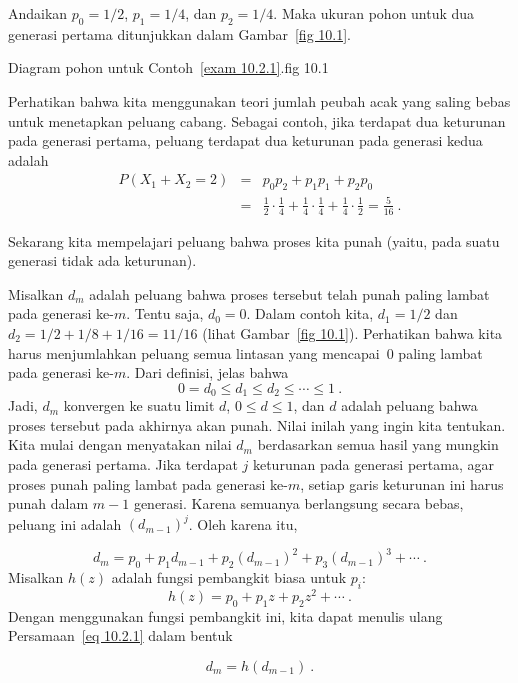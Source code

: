 \begin{example}\label{exam 10.2.1}
Andaikan $p_0 = 1/2$, $p_1 = 1/4$, dan $p_2 = 1/4$.  Maka ukuran pohon
untuk dua generasi pertama ditunjukkan dalam Gambar~\ref{fig 10.1}.

{Diagram pohon untuk Contoh~\protect\ref{exam 10.2.1}\protect.}{fig 10.1}

Perhatikan bahwa kita menggunakan teori jumlah peubah acak yang saling bebas untuk menetapkan
peluang cabang.  Sebagai contoh, jika terdapat dua keturunan pada generasi pertama,
peluang terdapat dua keturunan pada generasi kedua adalah
\begin{eqnarray*}
P(X_1 + X_2 = 2) &=& p_0p_2 + p_1p_1 + p_2p_0 \\
                 &=& \frac12\cdot\frac14 + \frac14\cdot\frac14 +
\frac14\cdot\frac12 = \frac 5{16}\ .
\end{eqnarray*}
\par
Sekarang kita mempelajari peluang bahwa proses kita punah (yaitu, pada suatu
generasi tidak ada keturunan).
\par
Misalkan $d_m$ adalah peluang bahwa proses tersebut telah punah paling lambat pada generasi
ke-$m$.  Tentu saja, $d_0 = 0$.  Dalam contoh kita, $d_1 = 1/2$ dan $d_2 = 1/2
+ 1/8 + 1/16 = 11/16$ (lihat Gambar~\ref{fig 10.1}).  Perhatikan bahwa kita harus menjumlahkan 
peluang semua lintasan yang mencapai~0 paling lambat pada generasi ke-$m$.  Dari definisi, 
jelas bahwa
$$
0 = d_0 \leq d_1 \leq d_2 \leq\cdots\leq 1\ .
$$
Jadi, $d_m$ konvergen ke suatu limit $d$, $0 \leq d \leq 1$, dan $d$ adalah
peluang bahwa proses tersebut pada akhirnya akan punah.  Nilai inilah yang ingin
kita tentukan.  Kita mulai dengan menyatakan nilai $d_m$ berdasarkan semua
hasil yang mungkin pada generasi pertama.  Jika terdapat $j$ keturunan pada
generasi pertama, agar proses punah paling lambat pada generasi ke-$m$, setiap garis keturunan ini
harus punah dalam $m - 1$ generasi.  Karena semuanya berlangsung secara bebas,
peluang ini adalah $(d_{m - 1})^j$.  Oleh karena itu,
 
\begin{equation}
d_m = p_0 + p_1d_{m - 1} + p_2(d_{m - 1})^2 + p_3(d_{m - 1})^3 +\cdots\ .
\label{eq 10.2.1} 
\end{equation} 
Misalkan $h(z)$ adalah fungsi pembangkit biasa untuk $p_i$:
$$
h(z) = p_0 + p_1z + p_2z^2 +\cdots\ .
$$
Dengan menggunakan fungsi pembangkit ini, kita dapat menulis ulang Persamaan~\ref{eq 10.2.1} dalam bentuk

\begin{equation}
d_m = h(d_{m - 1})\ . 
\label{eq 10.2.2}
\end{equation}
 

\end{example}
